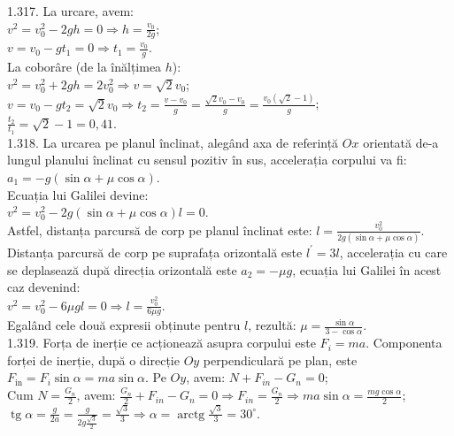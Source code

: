 1.317. La urcare, avem:\\ $v^{2}=v_{0}^{2}-2 g h=0 \Rightarrow h=\frac{v_{0}}{2 g}$;\\ $v=v_{0}-g t_{1}=0 \Rightarrow t_{1}=\frac{v_{0}}{g}$.\\ La coborâre (de la înălțimea $h$):\\ $v^{2}=v_{0}^{2}+2 g h=2 v_{0}^{2} \Rightarrow v=\sqrt{2} v_{0}$;\\ $v=v_{0}-g t_{2}=\sqrt{2} v_{0} \Rightarrow t_{2}=\frac{v-v_{0}}{g}=\frac{\sqrt{2} v_{0}-v_{0}}{g}=\frac{v_{0}(\sqrt{2}-1)}{g}$;\\ $\frac{t_{2}}{t_{1}}=\sqrt{2}-1=0,41$.\\

1.318. La urcarea pe planul înclinat, alegând axa de referință $Ox$ orientată de-a lungul planului înclinat cu sensul pozitiv în sus, accelerația corpului va fi:\\ $a_{1}=-g(\sin \alpha+\mu \cos \alpha)$.\\ Ecuația lui Galilei devine:\\ $v^{2}=v_{0}^{2}-2 g(\sin \alpha+\mu \cos \alpha) l=0$.\\ Astfel, distanța parcursă de corp pe planul înclinat este: $l=\frac{v_{0}^{2}}{2 g(\sin \alpha+\mu \cos \alpha)}$.\\ Distanța parcursă de corp pe suprafața orizontală este $l^{\prime}=3 l$, accelerația cu care se deplasează după direcția orizontală este $a_{2}=-\mu g$, ecuația lui Galilei în acest caz devenind:\\ $v^{2}=v_{0}^{2}-6 \mu g l=0 \Rightarrow l=\frac{v_{0}^{2}}{6 \mu g}$.\\ Egalând cele două expresii obținute pentru $l$, rezultă: $\mu=\frac{\sin \alpha}{3-\cos \alpha}$.\\

1.319. Forța de inerție ce acționează asupra corpului este $F_{i}=m a$. Componenta forței de inerție, după o direcție $Oy$ perpendiculară pe plan, este $F_{\text {in}}=F_{i} \sin \alpha=m a \sin \alpha$. Pe $Oy$, avem: $N+F_{i n}-G_{n}=0$;\\ Cum $N=\frac{G_{n}}{2}$, avem: $\frac{G_{n}}{2}+F_{i n}-G_{n}=0 \Rightarrow F_{i n}=\frac{G_{n}}{2} \Rightarrow m a \sin \alpha=\frac{m g \cos \alpha}{2}$;\\ $\operatorname{tg} \alpha=\frac{g}{2 a}=\frac{g}{2 g \frac{\sqrt{3}}{2}}=\frac{\sqrt{3}}{3} \Rightarrow \alpha=\operatorname{arctg} \frac{\sqrt{3}}{3}=30^{\circ}$.\\

